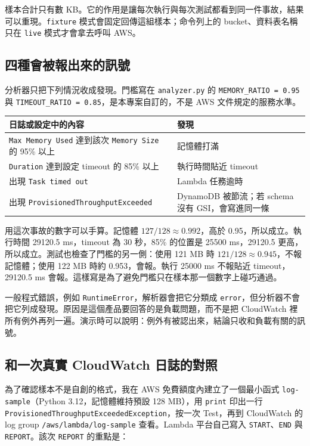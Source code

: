\documentclass[11pt]{article}
\begin{document}
樣本合計只有數 KB。它的作用是讓每次執行與每次測試都看到同一件事故，結果可以重現。\texttt{fixture} 模式會固定回傳這組樣本；命令列上的 bucket、資料表名稱只在 \texttt{live} 模式才會拿去呼叫 AWS。

\subsection{四種會被報出來的訊號}

分析器只把下列情況收成發現。門檻寫在 \texttt{analyzer.py} 的 \texttt{MEMORY\_RATIO = 0.95} 與 \texttt{TIMEOUT\_RATIO = 0.85}，是本專案自訂的，不是 AWS 文件規定的服務水準。

\begin{center}
\begin{tabular}{lp{8.6cm}}
\toprule
日誌或設定中的內容 & 發現 \\
\midrule
\texttt{Max Memory Used} 達到該次 \texttt{Memory Size} 的 95\% 以上 & 記憶體打滿 \\
\texttt{Duration} 達到設定 timeout 的 85\% 以上 & 執行時間貼近 timeout \\
出現 \texttt{Task timed out} & Lambda 任務逾時 \\
出現 \texttt{ProvisionedThroughputExceeded} & DynamoDB 被節流；若 schema 沒有 GSI，會寫進同一條 \\
\bottomrule
\end{tabular}
\end{center}

用這次事故的數字可以手算。記憶體 \(127 / 128 \approx 0.992\)，高於 0.95，所以成立。執行時間 29120.5 ms，timeout 為 30 秒，85\% 的位置是 25500 ms，29120.5 更高，所以成立。測試也檢查了門檻的另一側：使用 121 MB 時 \(121 / 128 \approx 0.945\)，不報記憶體；使用 122 MB 時約 0.953，會報。執行 25000 ms 不報貼近 timeout，29120.5 ms 會報。這樣寫是為了避免門檻只在樣本那一個數字上碰巧通過。

一般程式錯誤，例如 \texttt{RuntimeError}，解析器會把它分類成 \texttt{error}，但分析器不會把它列成發現。原因是這個產品要回答的是負載問題，而不是把 CloudWatch 裡所有例外再列一遍。演示時可以說明：例外有被認出來，結論只收和負載有關的訊號。

\subsection{和一次真實 CloudWatch 日誌的對照}

為了確認樣本不是自創的格式，我在 AWS 免費額度內建立了一個最小函式 \texttt{log-sample}（Python 3.12，記憶體維持預設 128 MB），用 \texttt{print} 印出一行 \texttt{ProvisionedThroughputExceededException}，按一次 Test，再到 CloudWatch 的 log group \texttt{/aws/lambda/log-sample} 查看。Lambda 平台自己寫入 \texttt{START}、\texttt{END} 與 \texttt{REPORT}。該次 \texttt{REPORT} 的重點是：
\end{document}
